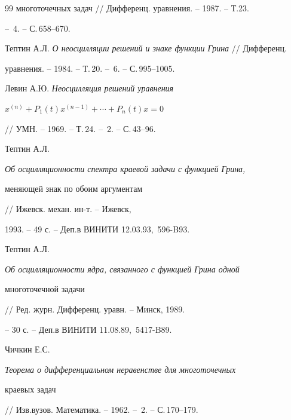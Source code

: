 \begin{thebibliography}{99}
{многоточечных задач} // Дифференц. уравнения. -- 1987. -- Т.23.


-- \No\,4. -- С.\,658--670.




Тептин А.Л. {\em О неосцилляции решений и знаке функции Грина} // Дифференц.


уравнения. -- 1984. -- Т.\,20. -- \No\,6. -- С.\,995--1005.




Левин А.Ю. {\em Неосцилляция решений уравнения}


$x^{(n)}+P_1(t)x^{(n-1)}+\dotsb+P_n(t)x=0$


// УМН. -- 1969. -- Т.\,24. -- \No\,2. -- С.\,43--96.




Тептин А.Л. {\em Об осцилляционности спектра краевой задачи с функцией Грина,


меняющей знак по обоим аргументам} // Ижевск. механ. ин-т. -- Ижевск,


1993. -- 49 с. -- Деп.в ВИНИТИ 12.03.93, \No\,596-B93. 




Тептин А.Л. {\em Об осцилляционности ядра, связанного с функцией Грина одной


многоточечной задачи} // Ред. журн. Дифференц. уравн. -- Минск, 1989.


-- 30 с. -- Деп.в ВИНИТИ 11.08.89, \No\,5417-B89.




Чичкин Е.С. {\em Теорема о дифференциальном неравенстве для многоточечных


краевых задач} // Изв.вузов. Математика. -- 1962. -- \No\,2. -- С.\,170--179.





\end{thebibliography}





\vskip 2cm














\label{end}





